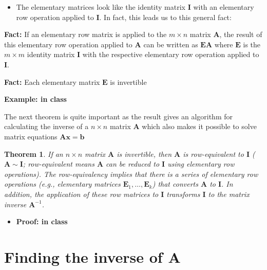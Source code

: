 \documentclass[
]{book}
\providecommand{\tightlist}{%
  \setlength{\itemsep}{0pt}\setlength{\parskip}{0pt}}
\newtheorem{theorem}{Theorem}[chapter]
\theoremstyle{definition}
\theoremstyle{definition}
\theoremstyle{definition}
\theoremstyle{remark}
\begin{document}
\begin{itemize}
\tightlist
\item
  The elementary matrices look like the identity matrix \(\mathbf{I}\) with an elementary row operation applied to \(\mathbf{I}\). In fact, this leads us to this general fact:
\end{itemize}

\textbf{Fact:} If an elementary row matrix is applied to the \(m \times n\) matrix \(\mathbf{A}\), the result of this elementary row operation applied to \(\mathbf{A}\) can be written as \(\mathbf{E} \mathbf{A}\) where \(\mathbf{E}\) is the \(m \times m\) identity matrix \(\mathbf{I}\) with the respective elementary row operation applied to \(\mathbf{I}\).

\textbf{Fact:} Each elementary matrix \(\mathbf{E}\) is invertible

\textbf{Example: in class}

The next theorem is quite important as the result gives an algorithm for calculating the inverse of a \(n \times n\) matrix \(\mathbf{A}\) which also makes it possible to solve matrix equations \(\mathbf{A}\mathbf{x} = \mathbf{b}\)

\begin{theorem}
\protect\hypertarget{thm:unnamed-chunk-145}{}{\label{thm:unnamed-chunk-145} }If an \(n \times n\) matrix \(\mathbf{A}\) is invertible, then \(\mathbf{A}\) is row-equivalent to \(\mathbf{I}\) (\(\mathbf{A} \sim \mathbf{I}\); row-equivalent means \(\mathbf{A}\) can be reduced to \(\mathbf{I}\) using elementary row operations). The row-equivalency implies that there is a series of elementary row operations (e.g., elementary matrices \(\mathbf{E}_1, \ldots, \mathbf{E}_k\)) that converts \(\mathbf{A}\) to \(\mathbf{I}\). In addition, the application of these row matrices to \(\mathbf{I}\) transforms \(\mathbf{I}\) to the matrix inverse \(\mathbf{A}^{-1}\).
\end{theorem}

\begin{itemize}
\tightlist
\item
  \textbf{Proof: in class}
\end{itemize}

\hypertarget{finding-the-inverse-of-mathbfa}{%
\section{\texorpdfstring{Finding the inverse of \(\mathbf{A}\)}{Finding the inverse of \textbackslash mathbf\{A\}}}\label{finding-the-inverse-of-mathbfa}}
\end{document}
